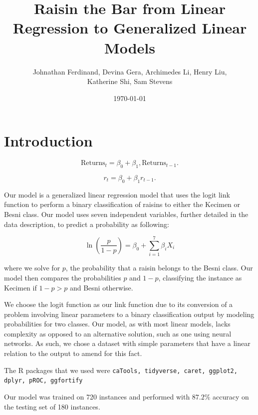 \documentclass{article}
\title{Raisin the Bar from Linear Regression to Generalized Linear Models}
\author{Johnathan Ferdinand, Devina Gera, Archimedes Li, Henry Liu, \\Katherine Shi, Sam Stevens}
\date{\today}
\begin{document}
\maketitle

\section{Introduction}

\[
\text{Returns}_t = \beta_0 + \beta_1,\text{Returns}_{t-1}.
\]

\[
r_t = \beta_0 + \beta_1r_{t-1}.
\]

Our model is a generalized linear regression model that uses the logit link function to perform a binary classification of raisins to either the Kecimen or Besni class. Our model uses seven independent variables, further detailed in the data description, to predict a probability as following:

$$\ln \left( \frac{p}{1-p}\right) = \beta_0 + \sum_{i=1}^{7} \beta_i X_i$$

where we solve for $p$, the probability that a raisin belongs to the Besni class. Our model then compares the probabilities $p$ and $1-p$, classifying the instance as Kecimen if $1-p > p$ and Besni otherwise.

We choose the logit function as our link function due to its conversion of a problem involving linear parameters to a binary classification output by modeling probabilities for two classes. Our model, as with most linear models, lacks complexity as opposed to an alternative solution, such as one using neural networks. As such, we chose a dataset with simple parameters that have a linear relation to the output to amend for this fact.

The R packages that we used were \texttt{caTools, tidyverse, caret, ggplot2, dplyr, pROC, ggfortify}

Our model was trained on 720 instances and performed with $87.2\%$ accuracy on the testing set of 180 instances.
\end{document}

